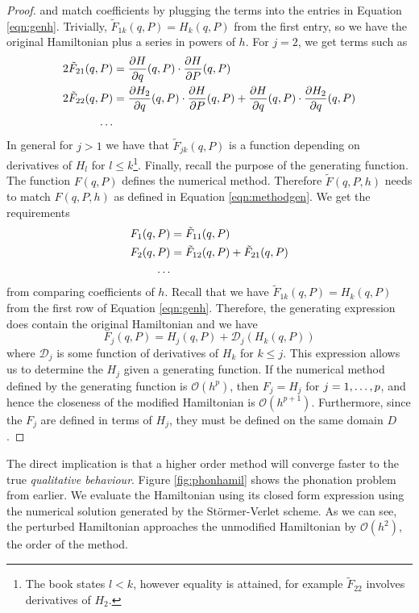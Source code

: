 \documentclass{report}
\theoremstyle{exampstyle} \newtheorem{example}[theorem]{Example}
\theoremstyle{exampstyle} \newtheorem{remark}[theorem]{Remark}
\theoremstyle{exampstyle} \newtheorem{definition}[theorem]{Definition}
\theoremstyle{exampstyle} \newtheorem{lemma}[theorem]{Lemma}
\theoremstyle{exampstyle} \newtheorem{proposition}[theorem]{Proposition}
\begin{document}
\begin{proof}
	and match coefficients by plugging the terms into the entries in Equation \ref{eqn:genh}.
	Trivially, $\tilde{F}_{1k}(q,P) = H_k(q,P)$ from the first entry, so we have the original Hamiltonian plus a series in powers of $h$.
	For $j=2$, we get terms such as
	\begin{align*}
		2 \tilde{F}_{21}(q,P) &= \frac{\partial H}{\partial q}(q,P) \cdot \frac{\partial H}{\partial P}(q,P) \\
		2 \tilde{F}_{22}(q,P) &= \frac{\partial H_2}{\partial q}(q,P) \cdot \frac{\partial H}{\partial P}(q,P) + \frac{\partial H}{\partial q}(q,P) \cdot \frac{\partial H_2}{\partial q}(q,P) \\
		\mathellipsis
	\end{align*}
	In general for $j > 1$ we have that $\tilde{F}_{jk}(q,P)$ is a function depending on derivatives of $H_l$ for $l \leq k$\footnote{
		The book states $l < k$, however equality is attained, for example $\tilde{F}_{22}$ involves derivatives of $H_2$.
	}.
	Finally, recall the purpose of the generating function.
	The function $F(q,P)$ defines the numerical method.
	Therefore $\tilde{F}(q,P,h)$ needs to match $F(q,P,h)$ as defined in Equation \ref{eqn:methodgen}.
	We get the requirements
	\begin{align*}
		F_1(q,P) &= \tilde{F}_{11}(q,P) \\
		F_2(q,P) &= \tilde{F}_{12}(q,P) + \tilde{F}_{21}(q,P) \\
		\mathellipsis
	\end{align*}
	from comparing coefficients of $h$.
	Recall that we have $\tilde{F}_{1k}(q,P) = H_k(q,P)$ from the first row of Equation \ref{eqn:genh}.
	Therefore, the generating expression does contain the original Hamiltonian and we have
	\begin{equation*}
		F_j(q,P) = H_j(q,P) + \mathcal{D}_j(H_k(q,P))
	\end{equation*}
	where $\mathcal{D}_j$ is some function of derivatives of $H_k$ for $k \leq j$.
	This expression allows us to determine the $H_j$ given a generating function. %
	If the numerical method defined by the generating function is $\mathcal{O}(h^p)$,
	then $F_j = H_j$ for $j = 1, \mathellipsis, p$, and hence the closeness of the modified Hamiltonian is $\mathcal{O}(h^{p+1})$.
	Furthermore, since the $F_j$ are defined in terms of $H_j$, they must be defined on the same domain $D$.
\end{proof}

The direct implication is that a higher order method will converge faster to the true \textit{qualitative behaviour}.
Figure \ref{fig:phonhamil} shows the phonation problem from earlier.
We evaluate the Hamiltonian using its closed form expression using the numerical solution generated by the St\"ormer-Verlet scheme.
As we can see, the perturbed Hamiltonian approaches the unmodified Hamiltonian by $\mathcal{O}(h^2)$, the order of the method.
\end{document}
